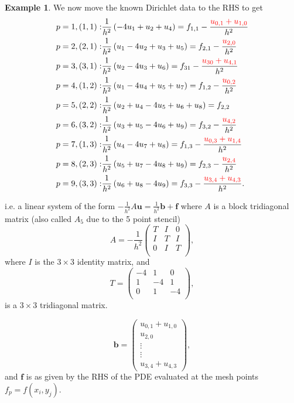 \documentclass[12pt, a4paper]{article}
\renewcommand{\vec}[1]{\mathbf{#1}}
\theoremstyle{definition}
\newtheorem{example}[thm]{Example}
\theoremstyle{remark}
\numberwithin{equation}{section}
\begin{document}
\begin{example}
We now move the known Dirichlet data to the RHS to get
\begin{align*}
p=1, (1,1):&\frac{1}{h^{2}}\left(-4 u_{1}+u_{2}+u_{4}\right)=f_{1,1}-\frac{\color{red}u_{0,1}+u_{1,0}}{h^{2}}\\
p=2,(2,1):&\frac{1}{h^{2}}\left(u_{1}-4 u_{2}+u_{3}+u_{5}\right)=f_{2,1}-\frac{\color{red}u_{2,0}}{h^{2}}\\
p=3,(3,1): &\frac{1}{h^{2}}\left(u_{2}-4 u_{3}+u_{6}\right)=f_{31}-\frac{\color{red}u_{30}+u_{4,1}}{h^{2}}\\
p=4,(1,2):&\frac{1}{h^{2}}\left(u_{1}-4 u_{4}+u_{5}+u_{7}\right)=f_{1,2}-\frac{\color{red}u_{0,2}}{h^{2}}\\
p=5,(2,2):&\frac{1}{h^{2}}\left(u_{2}+u_{4}-4 u_{5}+u_{6}+u_{8}\right)=f_{2,2}\\
p=6,(3,2): & \frac{1}{h^{2}}\left(u_{3}+u_{5}-4 u_{6}+u_{9}\right)=f_{3,2}-\frac{\color{red}u_{4,2}}{h^{2}}\\
p=7,(1,3):& \frac{1}{h^{2}}\left(u_{4}-4 u_{7}+u_{8}\right)=f_{1,3}-\frac{\color{red}u_{0,3}+u_{1,4}}{h^{2}}\\
p=8,(2,3):&\frac{1}{h^{2}}\left(u_{5}+u_{7}-4 u_{8}+u_{9}\right)=f_{2,3}-\frac{\color{red}u_{2,4}}{h^{2}}\\
p=9,(3,3):&\frac{1}{h^{2}}\left(u_{6}+u_{8}-4 u_{9}\right)=f_{3,3}-\frac{\color{red}u_{3,4}+u_{4,3}}{h^{2}}.
\end{align*}

i.e. a linear system of the form $-\frac{1}{h^2}A\vec{u}=\frac{1}{h^2}\vec{b}+\vec{f}$ where
$A$ is a block tridiagonal matrix (also called $A_5$ due to the 5 point stencil)
\begin{equation*}
A=-\frac{1}{h^2}
\begin{pmatrix}
T &I&0\\
I &T&I\\
0 &I&T\\
\end{pmatrix},
\end{equation*}
where $I$ is the  $3\times 3$ identity matrix, and 
\begin{equation*}
T=
\begin{pmatrix}
-4 &1&0\\
1 &-4&1\\
0 &1&-4\\
\end{pmatrix},
\end{equation*}
is a $3 \times 3$ tridiagonal matrix.

\begin{equation*}
\vec{b}=
\begin{pmatrix}
u_{0,1}+u_{1,0}\\
u_{2,0}\\
\vdots\\
\vdots\\
u_{3,4}+u_{4,3}
\end{pmatrix},
\end{equation*}
and $\vec{f}$ is as given by the RHS of  the PDE evaluated at the mesh points $f_p = f(x_i, y_j)$.


\end{example}
\end{document}
